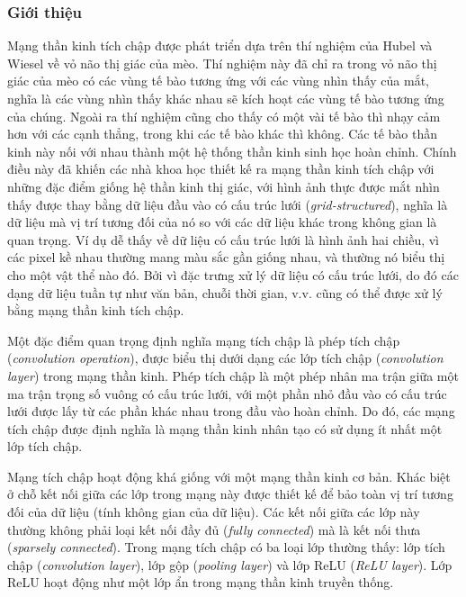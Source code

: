 \subsubsection{Giới thiệu}
Mạng thần kinh tích chập được phát triển dựa trên thí nghiệm của Hubel và Wiesel về vỏ não thị giác của mèo. Thí nghiệm này đã chỉ ra trong vỏ não thị giác của mèo có các vùng tế bào tương ứng với các vùng nhìn thấy của mắt, nghĩa là các vùng nhìn thấy khác nhau sẽ kích hoạt các vùng tế bào tương ứng của chúng. Ngoài ra thí nghiệm cũng cho thấy có một vài tế bào thì nhạy cảm hơn với các cạnh thẳng, trong khi các tế bào khác thì không. Các tế bào thần kinh này nối với nhau thành một hệ thống thần kinh sinh học hoàn chỉnh. Chính điều này đã khiến các nhà khoa học thiết kế ra mạng thần kinh tích chập với những đặc điểm giống hệ thần kinh thị giác, với hình ảnh thực được mắt nhìn thấy được thay bằng dữ liệu đầu vào có cấu trúc lưới (\textit{grid-structured}), nghĩa là dữ liệu mà vị trí tương đối của nó so với các dữ liệu khác trong không gian là quan trọng. Ví dụ dễ thấy về dữ liệu có cấu trúc lưới là hình ảnh hai chiều, vì các pixel kề nhau thường mang màu sắc gần giống nhau, và thường nó biểu thị cho một vật thể nào đó. Bởi vì đặc trưng xử lý dữ liệu có cấu trúc lưới, do đó các dạng dữ liệu tuần tự như văn bản, chuỗi thời gian, v.v. cũng có thể được xử lý bằng mạng thần kinh tích chập.\cite{Aggarwal2023}

Một đặc điểm quan trọng định nghĩa mạng tích chập là phép tích chập (\textit{convolution operation}), được biểu thị dưới dạng các lớp tích chập (\textit{convolution layer}) trong mạng thần kinh. Phép tích chập là một phép nhân ma trận giữa một ma trận trọng số vuông có cấu trúc lưới, với một phần nhỏ đầu vào có cấu trúc lưới được lấy từ các phần khác nhau trong đầu vào hoàn chỉnh. Do đó, các mạng tích chập được định nghĩa là mạng thần kinh nhân tạo có sử dụng ít nhất một lớp tích chập.

Mạng tích chập hoạt động khá giống với một mạng thần kinh cơ bản. Khác biệt ở chỗ kết nối giữa các lớp trong mạng này được thiết kế để bảo toàn vị trí tương đối của dữ liệu (tính không gian của dữ liệu). Các kết nối giữa các lớp này thường không phải loại kết nối đầy đủ (\textit{fully connected}) mà là kết nối thưa (\textit{sparsely connected}). Trong mạng tích chập có ba loại lớp thường thấy: lớp tích chập (\textit{convolution layer}), lớp gộp (\textit{pooling layer}) và lớp ReLU (\textit{ReLU layer}). Lớp ReLU hoạt động như một lớp ẩn trong mạng thần kinh truyền thống.

